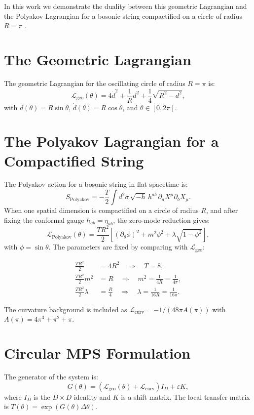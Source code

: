 \documentclass[12pt]{article}
\begin{document}
In this work we demonstrate the duality between this geometric Lagrangian
and the Polyakov Lagrangian for a bosonic string compactified on a circle of
radius $R = \pi$ \cite{polyakov1981,green2012,polchinski1998}.

\section{The Geometric Lagrangian}

The geometric Lagrangian for the oscillating circle of radius $R = \pi$ is:
\[
\mathcal{L}_{\text{geo}}(\theta) = 4\dot{d}^2 + \frac{1}{R}d^2 + \frac{1}{4}\sqrt{R^2-d^2},
\]
with $d(\theta) = R\sin\theta$, $\dot{d}(\theta) = R\cos\theta$, and
$\theta \in [0, 2\pi]$.

\section{The Polyakov Lagrangian for a Compactified String}

The Polyakov action for a bosonic string in flat spacetime is:
\[
S_{\text{Polyakov}} = -\frac{T}{2} \int d^2\sigma \, \sqrt{-h} \, h^{ab}
\, \partial_a X^\mu \partial_b X_\mu.
\]
When one spatial dimension is compactified on a circle of radius $R$, and
after fixing the conformal gauge $h_{ab} = \eta_{ab}$, the zero-mode
reduction gives:
\[
\mathcal{L}_{\text{Polyakov}}(\theta) = \frac{T R^2}{2} \left[
(\partial_\theta \phi)^2 + m^2 \phi^2 + \lambda \sqrt{1-\phi^2} \right],
\]
with $\phi = \sin\theta$. The parameters are fixed by comparing with
$\mathcal{L}_{\text{geo}}$:

\begin{align}
\frac{T R^2}{2} &= 4R^2 \quad\Rightarrow\quad T = 8,\\
\frac{T R^2}{2} m^2 &= R \quad\Rightarrow\quad m^2 = \frac{1}{4R} = \frac{1}{4\pi},\\
\frac{T R^2}{2} \lambda &= \frac{R}{4} \quad\Rightarrow\quad
\lambda = \frac{1}{16R} = \frac{1}{16\pi}.
\end{align}

The curvature background is included as $\mathcal{L}_{\text{curv}} =
-1/(48\pi A(\pi))$ with $A(\pi) = 4\pi^3 + \pi^2 + \pi$.

\section{Circular MPS Formulation}

The generator of the system is:
\[
G(\theta) = \left( \mathcal{L}_{\text{geo}}(\theta) + \mathcal{L}_{\text{curv}}
\right) I_D + \varepsilon K,
\]
where $I_D$ is the $D \times D$ identity and $K$ is a shift matrix.
The local transfer matrix is $T(\theta) = \exp(G(\theta) \Delta\theta)$.
\end{document}
